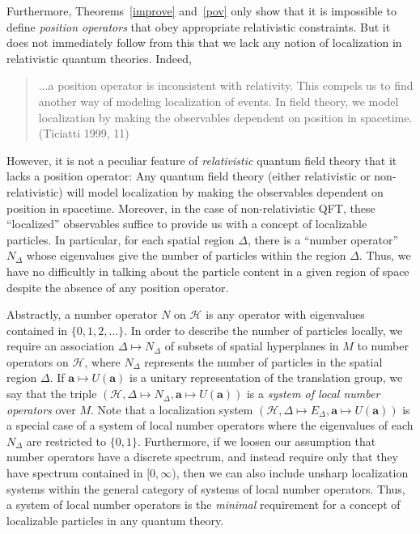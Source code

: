 \documentclass[12pt]{article}
\theoremstyle{remark}
\newcommand{\locsys}{(\mathcal{H},\Delta \mapsto
  E_{\Delta},\mathbf{a}\mapsto U(\mathbf{a}))}
\newcommand{\hil}[1]{\mathcal{#1}}
\begin{document}
Furthermore, Theorems~\ref{improve} and~\ref{pov} only show that it is
impossible to define \emph{position operators} that obey appropriate
relativistic constraints.  But it does not immediately follow from
this that we lack any notion of localization in relativistic quantum
theories.  Indeed,
\begin{quote} ...a position operator is
  inconsistent with relativity.  This compels us to find another way
  of modeling localization of events.  In field theory, we model
  localization by making the observables dependent on position in
  spacetime.  (Ticiatti 1999, 11) \end{quote} However, it is not a
peculiar feature of \emph{relativistic} quantum field theory that it
lacks a position operator: Any quantum field theory (either
relativistic or non-relativistic) will model localization by making
the observables dependent on position in spacetime.  Moreover, in the
case of non-relativistic QFT, these ``localized'' observables suffice
to provide us with a concept of localizable particles.  In particular,
for each spatial region $\Delta$, there is a ``number operator''
$N_{\Delta}$ whose eigenvalues give the number of particles within the
region $\Delta$.  Thus, we have no difficultly in talking about the
particle content in a given region of space despite the absence of any
position operator.

Abstractly, a number operator $N$ on $\hil{H}$ is any operator with
eigenvalues contained in $\{ 0,1,2,\dots \}$.  In order to describe
the number of particles locally, we require an association $\Delta
\mapsto N_{\Delta}$ of subsets of spatial hyperplanes in $M$ to number
operators on $\hil{H}$, where $N_{\Delta}$ represents the number of
particles in the spatial region $\Delta$.  If $\mathbf{a}\mapsto
U(\mathbf{a})$ is a unitary representation of the translation group,
we say that the triple $(\hil{H},\Delta \mapsto
N_{\Delta},\mathbf{a}\mapsto U(\mathbf{a}))$ is a \emph{system of
  local number operators} over $M$.  Note that a localization system
$\locsys$ is a special case of a system of local number operators
where the eigenvalues of each $N_{\Delta}$ are restricted to $\{ 0,1
\}$.  Furthermore, if we loosen our assumption that number operators
have a discrete spectrum, and instead require only that they have
spectrum contained in $[0,\infty )$, then we can also include unsharp
localization systems within the general category of systems of local
number operators.  Thus, a system of local number operators is the
\emph{minimal} requirement for a concept of localizable particles in
any quantum theory.
\end{document}
